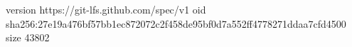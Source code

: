 version https://git-lfs.github.com/spec/v1
oid sha256:27e19a476bf57bb1ec872072c2f458de95bf0d7a552ff4778271ddaa7cfd4500
size 43802
